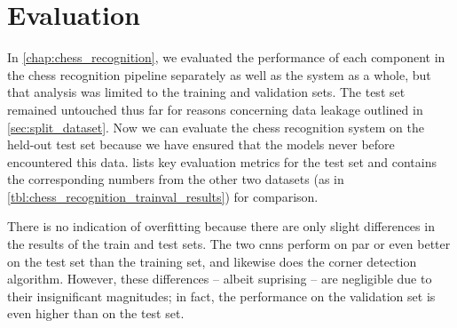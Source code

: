 \documentclass[../main.tex]{subfiles}
\begin{document}
\chapter{Evaluation}
\label{chap:evaluation}
In \cref{chap:chess_recognition}, we evaluated the performance of each component in the chess recognition pipeline separately as well as the system as a whole, but that analysis was limited to the training and validation sets.
The test set remained untouched thus far for reasons concerning data leakage outlined in \cref{sec:split_dataset}.
Now we can evaluate the chess recognition system on the held-out test set because we have ensured that the models never before encountered this data.
 lists key evaluation metrics for the test set and contains the corresponding numbers from the other two datasets (as in \cref{tbl:chess_recognition_trainval_results}) for comparison.
\begin{table}
    \caption[Performance of the chess recognition system on the test dataset.]{Performance of the chess recognition system on the test dataset. The training and validation metrics as per \cref{tbl:chess_recognition_trainval_results} are included for comparison.}
    \label{tbl:chess_recognition_trainvaltest_results}
\end{table}
There is no indication of overfitting because there are only slight differences in the results of the train and test sets.
The two \glspl{cnn} perform on par or even better on the test set than the training set, and likewise does the corner detection algorithm.
However, these differences -- albeit suprising -- are negligible due to their insignificant magnitudes; in fact, the performance on the validation set is even higher than on the test set.
\end{document}
